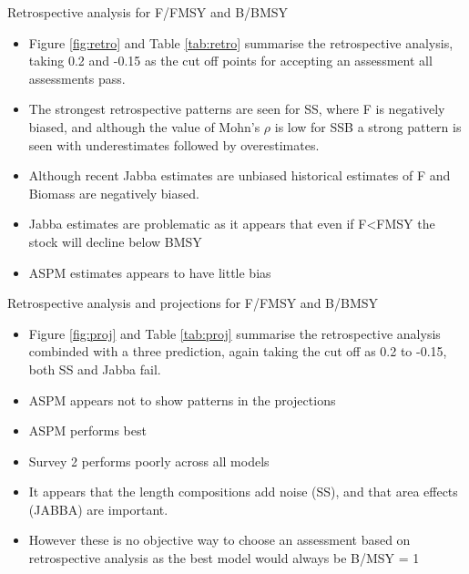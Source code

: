 \documentclass[a4paper]{article}
\begin{document}
    \begin{description}
    \item{Retrospective analysis for F/FMSY and B/BMSY}
    \begin{itemize}
         \item Figure \ref{fig:retro} and Table \ref{tab:retro} summarise the retrospective analysis, taking 0.2 and -0.15 as the cut off points for accepting an assessment all assessments pass. 
        \item The strongest retrospective patterns are seen for SS, where F is negatively biased, and although the value of Mohn's $\rho$ is low for SSB a strong pattern is seen with underestimates followed by overestimates. 
        \item Although recent Jabba estimates are unbiased historical estimates of F and Biomass are negatively biased.
        \item Jabba estimates are problematic as it appears that even if F<FMSY the stock will decline below BMSY
        \item ASPM estimates appears to have little bias
    \end{itemize}
    \begin{description}    
    \item{Retrospective analysis and projections for F/FMSY and B/BMSY} 
    \begin{itemize}
      \item Figure \ref{fig:proj} and Table \ref{tab:proj} summarise the retrospective analysis combinded with a three prediction, again taking the cut off as 0.2 to -0.15, both SS and Jabba fail.
      \item ASPM appears not to show patterns in the projections
        \item ASPM performs best
        \item Survey 2 performs poorly across all models
        \item It appears that the length compositions add noise (SS), and that area effects (JABBA) are important.
        \item However these is no objective way to choose an assessment based on retrospective analysis as the best model would always be B/MSY = 1 
   \end{itemize}

\end{description}
\end{description}
\end{document}
